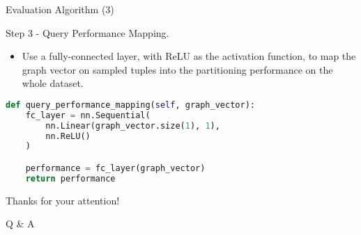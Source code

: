 \documentclass{beamer}
\begin{document}
\begin{frame}[fragile]{Evaluation Algorithm (3)}
    \begin{exampleblock}{Step 3 - Query Performance Mapping.}
        \begin{itemize}
            \item Use a fully-connected layer, with ReLU as the activation function, to map the graph vector on sampled tuples into the partitioning performance on the whole dataset.
        \end{itemize}
    \end{exampleblock}
    \vspace{0.15cm}
    \begin{minipage}{1.04\linewidth}
\begin{lstlisting}[language=python]
def query_performance_mapping(self, graph_vector):
    fc_layer = nn.Sequential(
        nn.Linear(graph_vector.size(1), 1),
        nn.ReLU()
    )

    performance = fc_layer(graph_vector)
    return performance
\end{lstlisting}
    \end{minipage}
\end{frame}



%     
%     

\begin{frame}
    \begin{center}
        {\Huge\calligra Thanks for your attention!}
        \vspace{1cm}

        {\Huge Q \& A}
    \end{center}
\end{frame}
\end{document}
